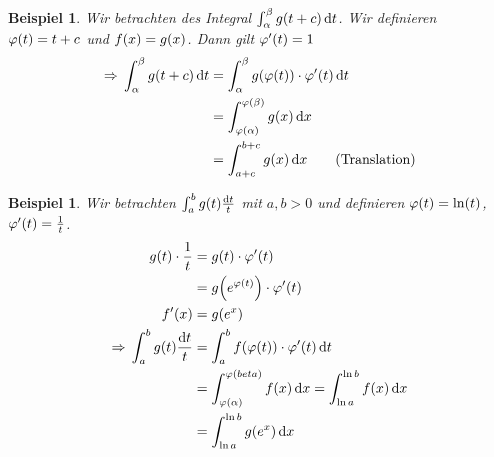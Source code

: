 \documentclass[11pt, twoside, a4paper]{article}
\theoremstyle{plain}
\newtheorem{beispiel}[blockelement]{Beispiel}
\numberwithin{equation}{subsection}
\newcommand{\pair}[1]{\left(#1\right)}
\newcommand{\of}[1]{\mathopen{}\mathclose{}\bgroup\left(#1\aftergroup\egroup\right)}
\newcommand{\impl}[0]{\Rightarrow{}}
\newcommand{\dif}{\mathop{}\!\mathrm{d}}
\begin{document}
    \begin{beispiel}
        Wir betrachten des Integral $\int_{\alpha}^{\beta} g\of{t+c} \dif t$. Wir definieren $\varphi\of{t} = t+c$ und $f\of{x} = g\of{x}$. Dann gilt $\varphi'\of{t} = 1$
        \begin{align*}
            \impl \int_{\alpha}^{\beta} g\of{t+c} \dif t &= \int_{\alpha}^{\beta} g\of{\varphi\of{t}}\cdot\varphi'\of{t} \dif t\\
            &= \int_{\varphi\of{\alpha}}^{\varphi\of{\beta}} g\of{x} \dif x\\
            &= \int_{a+c}^{b+c} g\of{x} \dif x\tag{Translation}
        \end{align*}
    \end{beispiel}

    \begin{beispiel}
        Wir betrachten $\int_{a}^{b} g\of{t} \frac{\dif t}{t}$ mit $a,b > 0$ und definieren $\varphi\of{t} = \ln\of{t}$, $\varphi'\of{t} = \frac{1}{t}$.
        \begin{align*}
            g\of{t}\cdot \frac{1}{t} &= g\of{t}\cdot\varphi'\of{t}\\
            &= g\of{e^{\varphi\of{t}}}\cdot\varphi'\of{t}\\
            f'\of{x} &= g\of{e^x}\\
            \impl \int_{a}^{b} g\of{t} \frac{\dif t}{t} &= \int_{a}^{b} f\of{\varphi\of{t}}\cdot\varphi'\of{t} \dif t\\
            &= \int_{\varphi\of{\alpha}}^{\varphi\of{beta}} f\of{x} \dif x = \int_{\ln a}^{\ln b} f\of{x} \dif x\\
            &= \int_{\ln a}^{\ln b} g\of{e^x} \dif x
        \end{align*}
    \end{beispiel}

\end{document}

